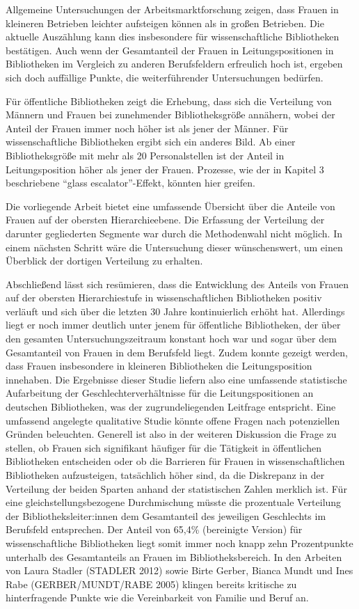 \documentclass[a4paper,
fontsize=11pt,
oneside,
numbers=noperiodatend,
parskip=half-,
bibliography=totoc,
final
]{scrartcl}
\begin{document}
Allgemeine Untersuchungen der Arbeitsmarktforschung zeigen, dass Frauen
in kleineren Betrieben leichter aufsteigen können als in großen
Betrieben. Die aktuelle Auszählung kann dies insbesondere für
wissenschaftliche Bibliotheken bestätigen. Auch wenn der Gesamtanteil
der Frauen in Leitungspositionen in Bibliotheken im Vergleich zu anderen
Berufsfeldern erfreulich hoch ist, ergeben sich doch auffällige Punkte,
die weiterführender Untersuchungen bedürfen.

Für öffentliche Bibliotheken zeigt die Erhebung, dass sich die
Verteilung von Männern und Frauen bei zunehmender Bibliotheksgröße
annähern, wobei der Anteil der Frauen immer noch höher ist als jener der
Männer. Für wissenschaftliche Bibliotheken ergibt sich ein anderes Bild.
Ab einer Bibliotheksgröße mit mehr als 20 Personalstellen ist der Anteil
in Leitungsposition höher als jener der Frauen. Prozesse, wie der in
Kapitel 3 beschriebene \enquote{glass escalator}-Effekt, könnten hier
greifen.

Die vorliegende Arbeit bietet eine umfassende Übersicht über die Anteile
von Frauen auf der obersten Hierarchieebene. Die Erfassung der
Verteilung der darunter gegliederten Segmente war durch die Methodenwahl
nicht möglich. In einem nächsten Schritt wäre die Untersuchung dieser
wünschenswert, um einen Überblick der dortigen Verteilung zu erhalten.

Abschließend lässt sich resümieren, dass die Entwicklung des Anteils von
Frauen auf der obersten Hierarchiestufe in wissenschaftlichen
Bibliotheken positiv verläuft und sich über die letzten 30 Jahre
kontinuierlich erhöht hat. Allerdings liegt er noch immer deutlich unter
jenem für öffentliche Bibliotheken, der über den gesamten
Untersuchungszeitraum konstant hoch war und sogar über dem Gesamtanteil
von Frauen in dem Berufsfeld liegt. Zudem konnte gezeigt werden, dass
Frauen insbesondere in kleineren Bibliotheken die Leitungsposition
innehaben. Die Ergebnisse dieser Studie liefern also eine umfassende
statistische Aufarbeitung der Geschlechterverhältnisse für die
Leitungspositionen an deutschen Bibliotheken, was der zugrundeliegenden
Leitfrage entspricht. Eine umfassend angelegte qualitative Studie könnte
offene Fragen nach potenziellen Gründen beleuchten. Generell ist also in
der weiteren Diskussion die Frage zu stellen, ob Frauen sich signifikant
häufiger für die Tätigkeit in öffentlichen Bibliotheken entscheiden oder
ob die Barrieren für Frauen in wissenschaftlichen Bibliotheken
aufzusteigen, tatsächlich höher sind, da die Diskrepanz in der
Verteilung der beiden Sparten anhand der statistischen Zahlen merklich
ist. Für eine gleichstellungsbezogene Durchmischung müsste die
prozentuale Verteilung der Bibliotheksleiter:innen dem Gesamtanteil des
jeweiligen Geschlechts im Berufsfeld entsprechen. Der Anteil von 65,4\%
(bereinigte Version) für wissenschaftliche Bibliotheken liegt somit
immer noch knapp zehn Prozentpunkte unterhalb des Gesamtanteils an
Frauen im Bibliotheksbereich. In den Arbeiten von Laura Stadler (STADLER
2012) sowie Birte Gerber, Bianca Mundt und Ines Rabe (GERBER/MUNDT/RABE
2005) klingen bereits kritische zu hinterfragende Punkte wie die
Vereinbarkeit von Familie und Beruf an.
\end{document}
